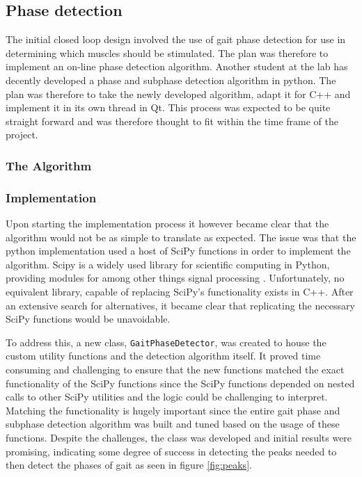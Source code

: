 \subsection{Phase detection}

The initial closed loop design involved the use of gait phase detection for use in determining which muscles should be stimulated. The plan was therefore to implement an on-line phase detection algorithm. Another student at the lab has decently developed a phase and subphase detection algorithm in python. The plan was therefore to take the newly developed algorithm, adapt it for C++ and implement it in its own thread in Qt. This process was expected to be quite straight forward and was therefore thought to fit within the time frame of the project.

\subsubsection{The Algorithm}

\subsubsection{Implementation}
Upon starting the implementation process it however became clear that the algorithm would not be as simple to translate as expected. The issue was that the python implementation used a host of SciPy \cite{noauthor_scipy_nodate} functions in order to implement the algorithm. Scipy is a  widely used library for scientific computing in Python, providing modules for among other things signal processing \cite{noauthor_scipy_nodate}. Unfortunately, no equivalent library, capable of replacing SciPy's functionality exists in C++. After an extensive search for alternatives, it became clear that replicating the necessary SciPy functions would be unavoidable.

To address this, a new class, \texttt{GaitPhaseDetector}, was created to house the custom utility functions and the detection algorithm itself. It proved time consuming and challenging to ensure that the new functions matched the exact functionality of the SciPy functions since the SciPy functions depended on nested calls to other SciPy utilities and the logic could be challenging to interpret. Matching the functionality is hugely important since the entire gait phase and subphase detection algorithm was built and tuned based on the usage of these functions. Despite the challenges, the class was developed and initial results were promising, indicating some degree of success in detecting the peaks needed to then detect the phases of gait as seen in figure \ref{fig:peaks}. 

